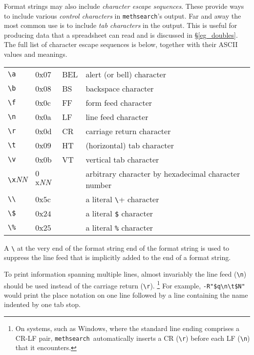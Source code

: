 \documentclass[a4paper,11pt,oneside]{book}
\def\textitidx#1{\textit{#1}\index{#1}}
\def\methsearch{\texttt{meth\-search}}
\newcommand{\sref}[1]{\hyperref[#1]{\S\ref{#1}}}
\begin{document}
Format strings may also include \textit{character escape sequences}.  
These provide ways to include various \textitidx{control characters} in 
\methsearch's output.  Far and away the most common use is to include
\textit{tab characters} in the output.  This is useful
for producing data that a spreadsheet can read
and is discussed in \sref{eg_doubles}.
The full list of character escape sequences is below,
together with their ASCII values and meanings. 

\begin{tabular}{llll}
\verb+\a+& $0$x$07$& BEL& alert (or bell) character\\
\verb+\b+& $0$x$08$& BS&  backspace character\\
\verb+\f+& $0$x$0$c& FF&  form feed character\\
\verb+\n+& $0$x$0$a& LF&  line feed character\\
\verb+\r+& $0$x$0$d& CR&  carriage return character\\
\verb+\t+& $0$x$09$& HT&  (horizontal) tab character\\
\verb+\v+& $0$x$0$b& VT&  vertical tab character\\
\verb+\x+\textit{NN}  &$0$x\textit{NN}&
  &arbitrary character by hexadecimal character number\\
\verb+\\+& $0$x$5$c&   &  a literal \verb+\+ character\\
\verb+\$+& $0$x$24$&   &  a literal \verb+$+ character\\
\verb+\%+& $0$x$25$&   &  a literal \verb+%+ character\\
\end{tabular}

A \verb+\+ at the very end of the format string end of the format 
string is used to suppress the line feed that is implicitly
added to the end of a format string.

To print information spanning multiple lines, almost invariably the
line feed (\verb+\n+) should be used instead of the 
carriage return (\verb+\r+).%
\footnote{On systems, such as Windows, where the standard
line ending comprises a CR-LF pair,
\methsearch\ automatically inserts a CR (\verb+\r+) before each LF (\verb+\n+) 
that it encounters.}  For example, \verb+-R"$q\n\t$N"+ would print the 
place notation on one line followed by a line containing the name 
indented by one tab stop.
\end{document}
